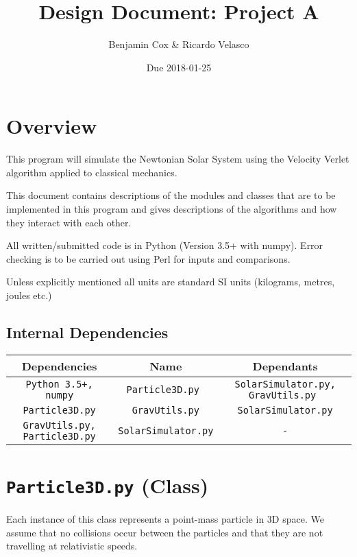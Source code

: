 \documentclass[a4paper, 11pt, british, left=1in, right=1in, top=0.3in, bottom=1in]{article}
\author{Benjamin Cox \& Ricardo Velasco}
\title{Design Document: Project A}
\date{Due 2018-01-25}
\begin{document}
	{\maketitle}
	
	\tableofcontents
	
	\pagebreak
	\section{Overview}
	
	This program will simulate the Newtonian Solar System using the Velocity Verlet algorithm applied to classical mechanics. 
	
	This document contains descriptions of the modules and classes that are to be implemented in this program and gives descriptions of the algorithms and how they interact with each other. 
	
	All written/submitted code is in Python (Version 3.5+ with numpy). Error checking is to be carried out using Perl for inputs and comparisons. 
	
	Unless explicitly mentioned all units are standard SI units (kilograms, metres, joules etc.)
	
	
	\subsection{Internal Dependencies}
	\begin{tabular}{|c|c|c|}
		\hline \rowcolor{NavyBlue} Dependencies & Name & Dependants \\ 
		\hline \texttt{Python 3.5+, numpy} & \texttt{Particle3D.py }& \texttt{SolarSimulator.py, GravUtils.py }\\ 
		\hline \texttt{Particle3D.py} & \texttt{GravUtils.py} &\texttt{SolarSimulator.py} \\ 
		\hline \texttt{GravUtils.py, Particle3D.py} & \texttt{SolarSimulator.py} & \texttt{-} \\ 
		\hline 
	\end{tabular} 
	\pagebreak
	
	\section{\texttt{Particle3D.py} (Class)}
	
	Each instance of this class represents a point-mass particle in 3D space. We assume that no collisions occur between the particles and that they are not travelling at relativistic speeds. 
	
\end{document}
